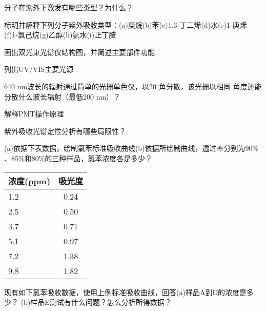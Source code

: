\begin{problemset}
\item 分子在紫外下激发有哪些类型？为什么？
\item 标明并解释下列分子紫外吸收类型：(a)庚烷(b)苯(c)1,3-丁二烯(d)水(e)1-庚烯
    (f)1-氯己烷(g)乙醇(h)氨水(i)正丁胺
\item 画出双光束光谱仪结构图，并简述主要部件功能
\item 列出UV/VIS主要光源
\item 640 nm波长的辐射通过简单的光栅单色仪，以20$^\circ$角分散，该光栅以相同
    角度还能分散什么波长辐射（最低200 nm）？
\item 解释PMT操作原理
\item 紫外吸收光谱定性分析有哪些局限性？
\item (a)依据下表数据，绘制氯苯标准吸收曲线(b)依据所绘制曲线，透过率分别为90\%
    、85\%和80\%的三种样品，氯苯浓度各是多少？

    \begin{center}
    \begin{tabular}{lc}
        \hline
        浓度(ppm) & 吸光度 \\
        \hline
        1.2 & 0.24 \\
        2.5 & 0.50 \\
        3.7 & 0.71 \\
        5.1 & 0.97 \\
        7.2 & 1.38 \\
        9.8 & 1.82 \\
        \hline
    \end{tabular}
    \end{center}
\item 现有如下氯苯吸收数据，使用上例标准吸收曲线，回答(a)样品A到D的浓度是多少？
    (b)样品E测试有什么问题？怎么分析所得数据？


\end{problemset}
